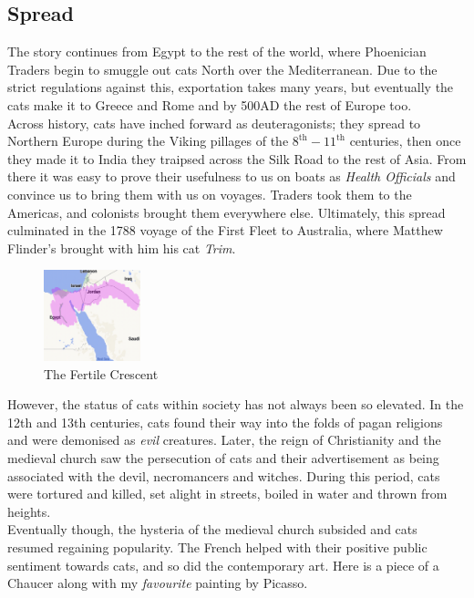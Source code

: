 \documentclass{article}
\begin{document}
\newpage
\subsection*{Spread}

The story continues from Egypt to the rest of the world, where Phoenician Traders begin to smuggle out cats North over the Mediterranean. Due to the strict regulations against this, exportation takes many years, but eventually the cats make it to Greece and Rome and by 500AD the rest of Europe too.\\

Across history, cats have inched forward as deuteragonists; they spread to Northern Europe during the Viking pillages of the \(8^{\text{th}} - 11^{\text{th}}\) centuries, then once they made it to India they traipsed across the Silk Road to the rest of Asia. From there it was easy to prove their usefulness to us on boats as \emph{Health Officials} and convince us to bring them with us on voyages. Traders took them to the Americas, and colonists brought them everywhere else. Ultimately, this spread culminated in the 1788 voyage of the First Fleet to Australia, where Matthew Flinder's brought with him his cat \emph{Trim}.\\

\begin{figure}
    \includegraphics[width=0.25\textwidth]{img/crescent.png}
    \caption{The Fertile Crescent}
\end{figure}


However, the status of cats within society has not always been so elevated. In the 12th and 13th centuries, cats found their way into the folds of pagan religions and were demonised as \emph{evil} creatures. Later, the reign of Christianity and the medieval church saw the persecution of cats and their advertisement as being associated with the devil, necromancers and witches. During this period, cats were tortured and killed, set alight in streets, boiled in water and thrown from heights.\\

Eventually though, the hysteria of the medieval church subsided and cats resumed regaining popularity. The French helped with their positive public sentiment towards cats, and so did the contemporary art. Here is a piece of a Chaucer along with my \emph{favourite} painting by Picasso.\\
\end{document}
